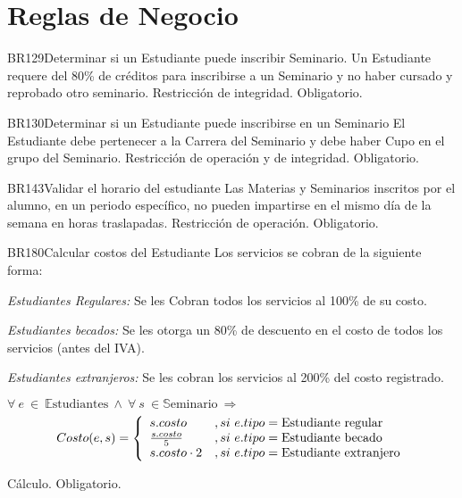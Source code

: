 
\section{Reglas de Negocio}

\begin{BussinesRule}{BR129}{Determinar si un Estudiante puede inscribir Seminario.} 
	\BRitem[Descripción:] Un Estudiante requere del 80\% de créditos para inscribirse a un Seminario y no haber cursado y reprobado otro seminario.
	\BRitem[Tipo:] Restricción de integridad.
	\BRitem[Nivel:] Obligatorio.
\end{BussinesRule}

\begin{BussinesRule}{BR130}{Determinar si un Estudiante puede inscribirse en un Seminario}
	\BRitem[Descripción:] El Estudiante debe pertenecer a la Carrera del Seminario y debe haber Cupo en el grupo del Seminario.
	\BRitem[Tipo:] Restricción de operación y de integridad.
	\BRitem[Nivel:] Obligatorio.
\end{BussinesRule}

\begin{BussinesRule}{BR143}{Validar el horario del estudiante}
	\BRitem[Descripción:] Las Materias y Seminarios inscritos por el alumno, en un periodo específico, no pueden impartirse en el mismo día de la semana en horas traslapadas.
	\BRitem[Tipo:] Restricción de operación.
	\BRitem[Nivel:] Obligatorio.
\end{BussinesRule}

\begin{BussinesRule}{BR180}{Calcular costos del Estudiante}
	\BRitem[Descripción:] Los servicios se cobran de la siguiente forma:
		\begin{Citemize}
			\item {\em Estudiantes Regulares:} Se les Cobran todos los servicios al 100\% de su costo.
			\item {\em Estudiantes becados:} Se les otorga un 80\% de descuento en el costo de todos los servicios (antes del IVA).
			\item {\em Estudiantes extranjeros:} Se les cobran los servicios al 200\% del costo registrado.
		\end{Citemize}
	\BRitem[Sentencia:] $\forall~e~\in~\mathbb{E}\textrm{studiantes}~\land~\forall~s~\in \mathbb{S}\textrm{eminario}~\Rightarrow$
		\begin{displaymath}
			Costo(e,s) = \left\{ \begin{array}{ll}
			s.costo & , si~e.tipo = \textrm{Estudiante regular}\\
			{s.costo}\over{5} & , si~e.tipo = \textrm{Estudiante becado}\\
			s.costo \cdot 2 & , si~e.tipo = \textrm{Estudiante extranjero}
			\end{array} \right.
		\end{displaymath}

	\BRitem[Tipo:] Cálculo.
	\BRitem[Nivel:] Obligatorio.
\end{BussinesRule}

